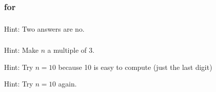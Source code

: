 \subsubsection{\answers for 
\subcongmod}

\subsubsection*{ \answers}
Hint: Two answers are no.

\subsubsection*{ \answers}
\begin{apart}
    \item Hint: Make $n$ a multiple of 3.
    \item Hint: Try $n=10$ because  10 is easy to compute (just the last digit)
    \item Hint: Try $n=10$ again.
\end{apart}
